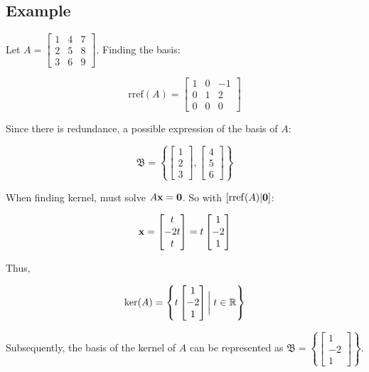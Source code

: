 \subsection{Example}

Let $A=\begin{bmatrix}1&4&7\\ 2&5&8\\3&6&9\end{bmatrix}$. Finding the basis:

\[
    \mathrm{rref}(A)=
     \begin{bmatrix}1&0&-1\\ 0&1&2\\0&0&0\end{bmatrix}
\] 

Since there is redundance, a possible expression of the basis of $A$:

\[\mathfrak{B}=\left\{\begin{bmatrix}1\\2\\3\end{bmatrix},\begin{bmatrix}4\\5\\6\end{bmatrix}\right\}\]

When finding kernel, must solve $A\textbf{x}=\textbf{0}$. So with $[\mathrm{rref}(A)|\textbf{0}]$:

\[\textbf{x}=\begin{bmatrix}t\\ -2t\\t\end{bmatrix}=t \begin{bmatrix}1\\-2\\1\end{bmatrix}\]

Thus,

\[\mathrm{ker}(A)=\left\{t\begin{bmatrix}1\\-2\\1\end{bmatrix}\bigg|\;t\in \mathbb{R}\right\}\]

\noindent
Subsequently, the basis of the kernel of $A$ can be represented as $\mathfrak{B}=\left\{\begin{bmatrix}1\\-2\\1\end{bmatrix}\right\}$.


